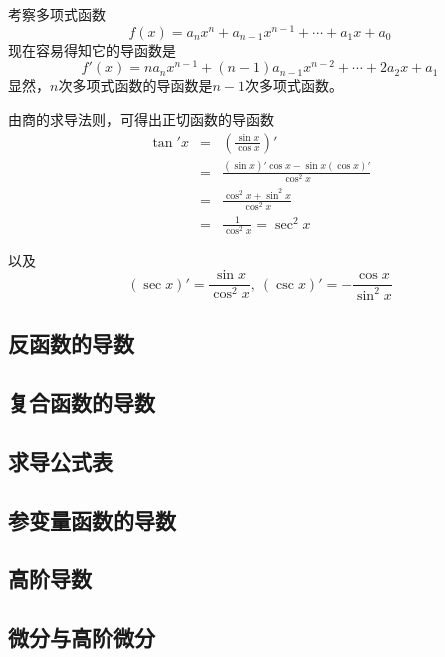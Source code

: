 \begin{example}
  考察多项式函数
  \[ f(x) = a_nx^n+a_{n-1}x^{n-1}+\cdots+a_1x+a_0 \]
  现在容易得知它的导函数是
  \[ f'(x) = na_nx^{n-1}+(n-1)a_{n-1}x^{n-2}+\cdots+2a_2x+a_1 \]
  显然，$n$次多项式函数的导函数是$n-1$次多项式函数。
\end{example}

\begin{example}
  由商的求导法则，可得出正切函数的导函数
  \begin{eqnarray*}
    \tan'{x} & = & \left( \frac{\sin{x}}{\cos{x}} \right)'  \\
             & = & \frac{(\sin{x})'\cos{x}-\sin{x}(\cos{x})'}{\cos^2{x}} \\
             & = & \frac{\cos^2{x}+\sin^2{x}}{\cos^2{x}} \\
    & = & \frac{1}{\cos^2{x}} = \sec^2{x}
  \end{eqnarray*}

  以及
  \[ (\sec{x})' = \frac{\sin{x}}{\cos^2{x}}, \  (\csc{x})'=-\frac{\cos{x}}{\sin^2{x}} \]
\end{example}


\subsection{反函数的导数}
\label{sec:derivative-of-revert-function}

\subsection{复合函数的导数}
\label{sec:derivative-of-embed-function}

\subsection{求导公式表}
\label{sec:table-of-derivative-formule}

\subsection{参变量函数的导数}
\label{sec:derivative-of-parametered-function}

\subsection{高阶导数}
\label{sec:high-level-derivative}

\subsection{微分与高阶微分}
\label{sec:difference-and-high-level-difference}




